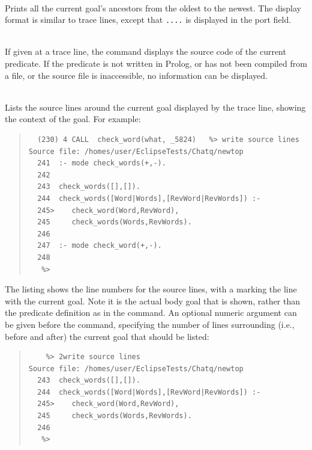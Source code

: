 \begin{descr}{1cm}

\\
Prints all the current goal's ancestors from the oldest to the newest.
The display format is similar to trace lines,
except that {\tt ....} is displayed in the port field.

\\
If given at a trace line, the command displays the source code of the
current predicate.
If the predicate is not written in Prolog, or has not been compiled from
a file, or the source file is inaccessible, no information can be displayed.

\\
Lists the source lines around the current goal displayed by the trace line,
showing the context of the goal. For example:

\begin{quote}
\begin{verbatim}
  (230) 4 CALL  check_word(what, _5824)   %> write source lines
Source file: /homes/user/EclipseTests/Chatq/newtop
  241  :- mode check_words(+,-).
  242
  243  check_words([],[]).
  244  check_words([Word|Words],[RevWord|RevWords]) :-
  245>    check_word(Word,RevWord),
  245     check_words(Words,RevWords).
  246
  247  :- mode check_word(+,-).
  248
   %>
\end{verbatim}
\end{quote}

The listing shows the line numbers for the source lines, with a \notation{>}
marking the line with the current goal. Note it is the actual body goal
that is shown, rather than the predicate definition as in the 
command.
An optional numeric argument can be given before the command, specifying
the number of lines surrounding (i.e., before and after) the current goal
that should be listed:

\begin{quote}
\begin{verbatim}
    %> 2write source lines
Source file: /homes/user/EclipseTests/Chatq/newtop
  243  check_words([],[]).
  244  check_words([Word|Words],[RevWord|RevWords]) :-
  245>    check_word(Word,RevWord),
  245     check_words(Words,RevWords).
  246
   %>
\end{verbatim}
\end{quote}


\end{descr}
